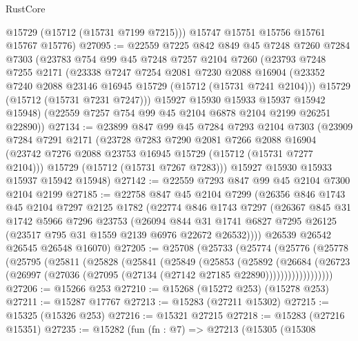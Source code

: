 \begin{lexlean}{RustCore}
\begin{coremodule}
        @15729
        (@15712 (@15731 @7199 @7215)))
      @15747
      @15751
      @15756
      @15761
      @15767
      @15776)
@27095 := @22559
    @7225
    @842
    @849
    @45
    @7248
    @7260
    @7284
    @7303
    (@23783
      @754
      @99
      @45
      @7248
      @7257
      @2104
      @7260
      (@23793
        @7248
        @7255
        @2171
        (@23338
          @7247
          @7254
          @2081
          @7230
          @2088
          @16904
          (@23352 @7240 @2088 @23146 @16945 @15729 (@15712 (@15731 @7241 @2104)))
          @15729
          (@15712 (@15731 @7231 @7247)))
        @15927
        @15930
        @15933
        @15937
        @15942
        @15948)
      (@22559 @7257 @754 @99 @45 @2104 @6878 @2104 @2199 @26251 @22890))
@27134 := @23899
    @847
    @99
    @45
    @7284
    @7293
    @2104
    @7303
    (@23909
      @7284
      @7291
      @2171
      (@23728
        @7283
        @7290
        @2081
        @7266
        @2088
        @16904
        (@23742 @7276 @2088 @23753 @16945 @15729 (@15712 (@15731 @7277 @2104)))
        @15729
        (@15712 (@15731 @7267 @7283)))
      @15927
      @15930
      @15933
      @15937
      @15942
      @15948)
@27142 := @22559 @7293 @847 @99 @45 @2104 @7300 @2104 @2199
@27185 := @22758
    @847
    @45
    @2104
    @7299
    (@26356
      @846
      @1743
      @45
      @2104
      @7297
      @2125
      @1782
      (@22774
        @846
        @1743
        @7297
        (@26367
          @845
          @31
          @1742
          @5966
          @7296
          @23753
          (@26094
            @844
            @31
            @1741
            @6827
            @7295
            @26125
            (@23517 @795 @31 @1559 @2139 @6976 @22672 @26532))))
      @26539
      @26542
      @26545
      @26548
      @16070)
@27205 := @25708
    (@25733
      (@25774
        (@25776
          (@25778
            (@25795
              (@25811
                (@25828
                  (@25841
                    (@25849
                      (@25853
                        (@25892
                          (@26684
                            (@26723
                              (@26997
                                (@27036 (@27095 (@27134 (@27142 @27185 @22890))))))))))))))))))
@27206 := @15266 @253
@27210 := @15268 (@15272 @253) (@15278 @253)
@27211 := @15287 @17767
@27213 := @15283 (@27211 @15302)
@27215 := @15325 (@15326 @253)
@27216 := @15321 @27215
@27218 := @15283 (@27216 @15351)
@27235 := @15282
    (fun (fn : @7) =>
    @27213
      (@15305
        (@15308

\end{coremodule}
\end{lexlean}

